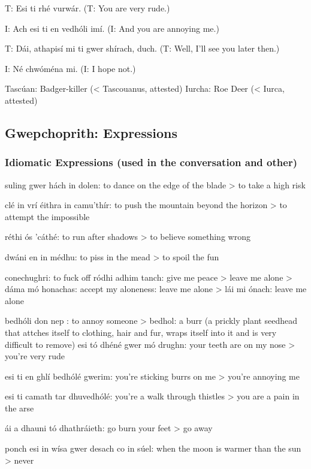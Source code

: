 T: Esi ti rh\'{e} vurw\'{a}r.
(T: You are very rude.)

I: Ach esi ti en vedh\'{o}li im\'{i}.
(I: And you are annoying me.)

T: D\'{a}i, athapis\'{i} mi ti gwer sh\'{i}rach, duch.
(T: Well, I'll see you later then.)

I: N\'{e} chw\'{o}m\'{e}na mi.
(I: I hope not.)

Tasc\'{u}an: Badger-killer (< Tascouanus, attested)
Iurcha: Roe Deer (< Iurca, attested)

\subsection{Gwepchoprith: Expressions}
\subsubsection{Idiomatic Expressions (used in the conversation and other)}

suling gwer h\'{a}ch in dolen: to dance on the edge of the blade
> to take a high risk

cl\'{e} in vr\'{i} \'{e}ithra in camu'th\'{i}r: to push the mountain beyond the horizon
> to attempt the impossible

r\'{e}thi \'{o}s 'c\'{a}th\'{e}: to run after shadows
> to believe something wrong

dw\'{a}ni en in m\'{e}dhu: to piss in the mead
> to spoil the fun

conechughri: to fuck off
r\'{o}dhi adhim tanch: give me peace > leave me alone
> d\'{a}ma m\'{o} honachas: accept my aloneness: leave me alone
> l\'{a}i mi \'{o}nach: leave me alone

bedh\'{o}li don nep : to annoy someone
> bedhol: a burr (a prickly plant seedhead that attches itself to clothing, hair and fur, wraps itself into it and is very difficult to remove) esi t\'{o} dh\'{e}n\'{e} gwer m\'{o} drughn: your teeth are on my nose 
> you're very rude

esi ti en ghl\'{i} bedh\'{o}l\'{e} gwerim: you're sticking burrs on me
> you're annoying me

esi ti camath tar dhuvedh\'{o}l\'{e}: you're a walk through thistles
> you are a pain in the arse

\'{a}i a dhauni t\'{o} dhathr\'{a}ieth: go burn your feet
> go away

ponch esi in w\'{i}sa gwer desach co in s\'{u}el: when the moon is warmer than the sun
> never

